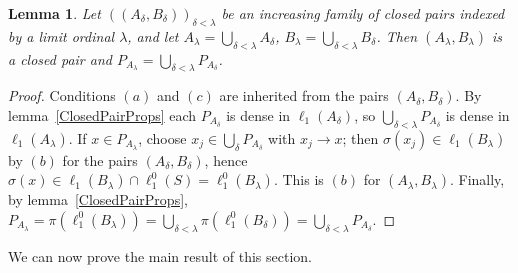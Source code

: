 \documentclass[12pt]{article}
\newtheorem{lemma}[theorem]{Lemma}
\newcommand{\lo}[1]{\ell_1^0(#1)}
\newcommand{\ellone}[1]{\ell_1(#1)}
\begin{document}
\begin{lemma}\label{UnionsOfClosedPairs} Let ${((A_\delta,B_\delta))}_{\delta<\lambda}$
    be an increasing family of closed pairs indexed by a limit ordinal
    $\lambda$, and let $A_\lambda=\bigcup_{\delta<\lambda}A_\delta$,
    $B_\lambda=\bigcup_{\delta<\lambda}B_\delta$. Then $(A_\lambda,B_\lambda)$
    is a closed pair and $P_{A_\lambda}=\bigcup_{\delta<\lambda}P_{A_\delta}$.
\end{lemma}
\begin{proof} Conditions $(a)$ and $(c)$ are inherited from the pairs
    $(A_\delta,B_\delta)$. By lemma~\ref{ClosedPairProps} each $P_{A_\delta}$
    is dense in $\ellone{A_\delta}$, so $\bigcup_{\delta<\lambda}P_{A_\delta}$
    is dense in $\ellone{A_\lambda}$. If $x\in P_{A_\lambda}$, choose
    $x_j\in\bigcup_\delta P_{A_\delta}$ with $x_j\to x$; then
    $\sigma(x_j)\in\ellone{B_\lambda}$ by $(b)$ for the pairs
    $(A_\delta,B_\delta)$, hence $\sigma(x)\in\ellone{B_\lambda}\cap\lo{S}=\lo{B_\lambda}$.
    This is $(b)$ for $(A_\lambda,B_\lambda)$. Finally, by
    lemma~\ref{ClosedPairProps},
    $P_{A_\lambda}=\pi(\lo{B_\lambda})=\bigcup_{\delta<\lambda}\pi(\lo{B_\delta})
    =\bigcup_{\delta<\lambda}P_{A_\delta}$.
\end{proof}

We can now prove the main result of this section.
\end{document}
